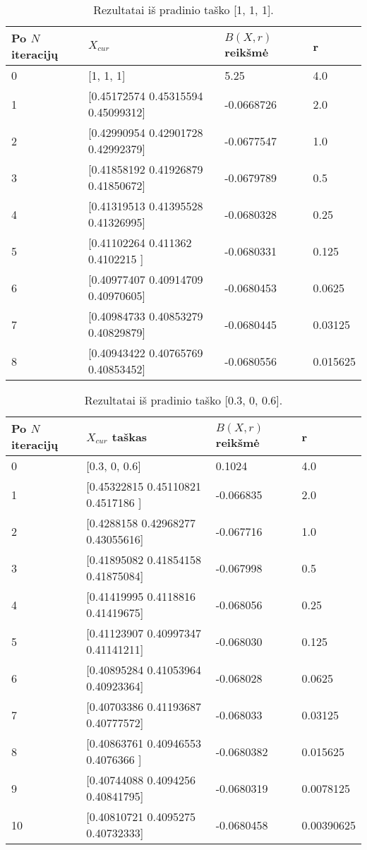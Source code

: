 \documentclass[a4paper,12pt,fleqn]{article}
\begin{document}
\begin{table}[H]
\centering
\caption{Rezultatai iš pradinio taško [1, 1, 1].}
\def\arraystretch{1.2}
\setlength{\tabcolsep}{0.8em}
\begin{tabular}{l l l l}
\hline\hline
Po $N$ iteracijų  & $X_{cur}$ & $B(X, r)$ reikšmė & r \\ [0.5ex]
\hline
0 & [1, 1, 1] & 5.25 & 4.0 \\
1 & [0.45172574 0.45315594 0.45099312] & -0.0668726 & 2.0 \\
2 & [0.42990954 0.42901728 0.42992379] & -0.0677547 & 1.0 \\
3 & [0.41858192 0.41926879 0.41850672] & -0.0679789 & 0.5 \\
4 & [0.41319513 0.41395528 0.41326995] & -0.0680328 & 0.25 \\
5 & [0.41102264 0.411362 0.4102215 ]   & -0.0680331 & 0.125 \\
6 & [0.40977407 0.40914709 0.40970605] & -0.0680453 & 0.0625 \\
7 & [0.40984733 0.40853279 0.40829879] & -0.0680445 & 0.03125 \\
8 & [0.40943422 0.40765769 0.40853452] & -0.0680556 & 0.015625 \\
\hline
\end{tabular}
\label{table:baudos_funkcijos_iteracijos2}
\end{table}


\begin{table}[H]
\centering
\caption{Rezultatai iš pradinio taško [0.3, 0, 0.6].}
\def\arraystretch{1.2}
\setlength{\tabcolsep}{0.8em}
\begin{tabular}{l l l l}
\hline\hline
Po $N$ iteracijų & $X_{cur}$ taškas & $B(X, r)$ reikšmė & r \\ [0.5ex]
\hline
0 & [0.3, 0, 0.6] & 0.1024 & 4.0 \\
1 & [0.45322815 0.45110821 0.4517186 ] & -0.066835 & 2.0 \\
2 & [0.4288158  0.42968277 0.43055616] & -0.067716 & 1.0 \\
3 & [0.41895082 0.41854158 0.41875084]  & -0.067998 & 0.5 \\
4 & [0.41419995 0.4118816  0.41419675]  & -0.068056 & 0.25 \\
5 & [0.41123907 0.40997347 0.41141211] & -0.068030 & 0.125 \\
6 & [0.40895284 0.41053964 0.40923364] & -0.068028 & 0.0625 \\
7 & [0.40703386 0.41193687 0.40777572] & -0.068033 & 0.03125 \\
8 & [0.40863761 0.40946553 0.4076366 ]  & -0.0680382 & 0.015625 \\
9 & [0.40744088 0.4094256  0.40841795]   & -0.0680319 & 0.0078125 \\
10 & [0.40810721 0.4095275  0.40732333] & -0.0680458 & 0.00390625 \\
\hline
\end{tabular}
\label{table:baudos_funkcijos_iteracijos3}
\end{table}
\end{document}
